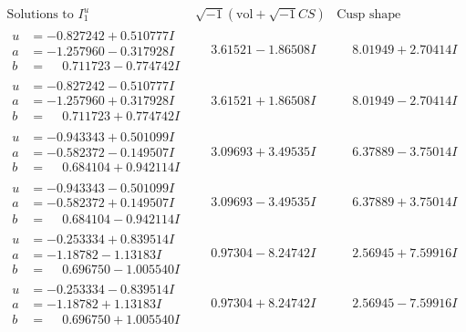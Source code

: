 \documentclass[1p]{elsarticle_modified}
\theoremstyle{definition}
\newcommand{\I}{\sqrt{-1}}
\begin{document}
$$\begin{array}{c|c|c}  
\text{Solutions to }I^u_{1}& \I (\text{vol} + \sqrt{-1}CS) & \text{Cusp shape}\\
 \hline 
\begin{aligned}
u &= -0.827242 + 0.510777 I \\
a &= -1.257960 - 0.317928 I \\
b &= \phantom{-}0.711723 - 0.774742 I\end{aligned}
 & \phantom{-}3.61521 - 1.86508 I & \phantom{-}8.01949 + 2.70414 I \\ \hline\begin{aligned}
u &= -0.827242 - 0.510777 I \\
a &= -1.257960 + 0.317928 I \\
b &= \phantom{-}0.711723 + 0.774742 I\end{aligned}
 & \phantom{-}3.61521 + 1.86508 I & \phantom{-}8.01949 - 2.70414 I \\ \hline\begin{aligned}
u &= -0.943343 + 0.501099 I \\
a &= -0.582372 - 0.149507 I \\
b &= \phantom{-}0.684104 + 0.942114 I\end{aligned}
 & \phantom{-}3.09693 + 3.49535 I & \phantom{-}6.37889 - 3.75014 I \\ \hline\begin{aligned}
u &= -0.943343 - 0.501099 I \\
a &= -0.582372 + 0.149507 I \\
b &= \phantom{-}0.684104 - 0.942114 I\end{aligned}
 & \phantom{-}3.09693 - 3.49535 I & \phantom{-}6.37889 + 3.75014 I \\ \hline\begin{aligned}
u &= -0.253334 + 0.839514 I \\
a &= -1.18782 - 1.13183 I \\
b &= \phantom{-}0.696750 - 1.005540 I\end{aligned}
 & \phantom{-}0.97304 - 8.24742 I & \phantom{-}2.56945 + 7.59916 I \\ \hline\begin{aligned}
u &= -0.253334 - 0.839514 I \\
a &= -1.18782 + 1.13183 I \\
b &= \phantom{-}0.696750 + 1.005540 I\end{aligned}
 & \phantom{-}0.97304 + 8.24742 I & \phantom{-}2.56945 - 7.59916 I \\ \hline\begin{aligned}

\end{aligned}
\end{array}$$
\end{document}
